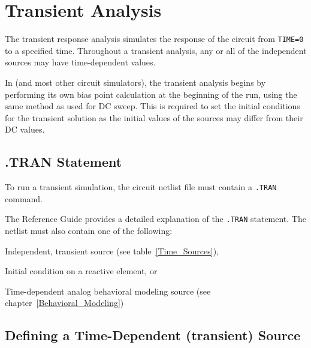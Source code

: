 \section{Transient Analysis}
\label{Trans_Overview}
\label{Transient_Analysis}
 

The transient response analysis simulates the response of the circuit from
\texttt{TIME=0} to a specified time.  Throughout a transient analysis, 
any or all of the independent sources may have time-dependent values.

In \Xyce{} (and most other circuit simulators), the transient analysis begins by performing its own bias 
point calculation at the beginning of the run, using the same method as used for DC sweep. This is required to set the initial conditions for the transient solution as the initial values of the 
sources may differ from their DC values.

\subsection{.TRAN Statement}

To run a transient simulation, the circuit netlist file must contain a
\verb|.TRAN| command.


The \Xyce{} Reference Guide\ReferenceGuide{} provides a detailed explanation of the \verb|.TRAN| statement. The netlist must also contain one of the following:

\begin{XyceItemize}
\item Independent, transient source (see table~\ref{Time_Sources}),
\item Initial condition on a reactive element, or
\item Time-dependent analog behavioral modeling source (see chapter~\ref{Behavioral_Modeling})
\end{XyceItemize}

\subsection{Defining a Time-Dependent (transient) Source}
\label{Defining_Source}

